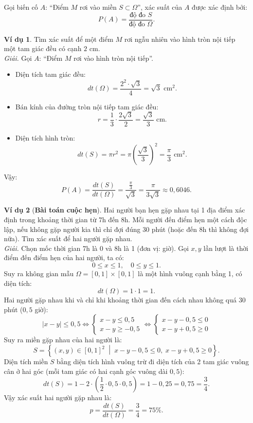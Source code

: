 \documentclass[12pt,a4paper]{article}
\theoremstyle{definition}
\newtheorem{vidu}{Ví dụ}[section]
\begin{document}
Gọi biến cố $A$: ``Điểm $M$ rơi vào miền $S \subset \Omega$'', xác suất của $A$ được xác định bởi:
\[
P(A) = \frac{\text{độ đo } S}{\text{độ đo } \Omega}.
\]

\begin{vidu}
Tìm xác suất để một điểm $M$ rơi ngẫu nhiên vào hình tròn nội tiếp một tam giác đều có cạnh $2\text{ cm}$.\\
\textit{Giải.} Gọi $A$: ``Điểm $M$ rơi vào hình tròn nội tiếp''.
\begin{itemize}
    \item Diện tích tam giác đều:
    \[
    dt(\Omega) = \frac{2^2 \cdot \sqrt{3}}{4} = \sqrt{3}\text{ cm}^2.
    \]
    \item Bán kính của đường tròn nội tiếp tam giác đều:
    \[
    r = \frac{1}{3} \cdot \frac{2\sqrt{3}}{2} = \frac{\sqrt{3}}{3}\text{ cm}.
    \]
    \item Diện tích hình tròn:
    \[
    dt(S) = \pi r^2 = \pi \left(\frac{\sqrt{3}}{3}\right)^2 = \frac{\pi}{3}\text{ cm}^2.
    \]
\end{itemize}
Vậy:
\[
P(A) = \frac{dt(S)}{dt(\Omega)} = \frac{\frac{\pi}{3}}{\sqrt{3}} = \frac{\pi}{3\sqrt{3}} \approx 0{,}6046.
\]
\end{vidu}

\begin{vidu}[\textbf{Bài toán cuộc hẹn}]
Hai người bạn hẹn gặp nhau tại 1 địa điểm xác định trong khoảng thời gian từ 7h đến 8h. Mỗi người đến điểm hẹn một cách độc lập, nếu không gặp người kia thì chỉ đợi đúng 30 phút (hoặc đến 8h thì không đợi nữa). Tìm xác suất để hai người gặp nhau.\\
\textit{Giải.}
Chọn mốc thời gian 7h là 0 và 8h là 1 (đơn vị: giờ).
Gọi $x, y$ lần lượt là thời điểm đến điểm hẹn của hai người, ta có:
\[
0 \le x \le 1, \quad 0 \le y \le 1.
\]
Suy ra không gian mẫu $\Omega = [0, 1] \times [0, 1]$ là một hình vuông cạnh bằng 1, có diện tích:
\[
dt(\Omega) = 1 \cdot 1 = 1.
\]
Hai người gặp nhau khi và chỉ khi khoảng thời gian đến cách nhau không quá 30 phút ($0{,}5$ giờ):
\[
|x - y| \le 0{,}5 \iff \begin{cases}
x - y \le 0{,}5 \\
x - y \ge -0{,}5
\end{cases} \iff \begin{cases}
x - y - 0{,}5 \le 0 \\
x - y + 0{,}5 \ge 0
\end{cases}
\]
Suy ra miền gặp nhau của hai người là:
\[
S = \left\{(x, y) \in [0, 1]^2 \;\middle|\; x - y - 0{,}5 \le 0, \; x - y + 0{,}5 \ge 0\right\}.
\]
Diện tích miền $S$ bằng diện tích hình vuông trừ đi diện tích của 2 tam giác vuông cân ở hai góc (mỗi tam giác có hai cạnh góc vuông dài $0{,}5$):
\[
dt(S) = 1 - 2 \cdot \left(\frac{1}{2} \cdot 0{,}5 \cdot 0{,}5\right) = 1 - 0{,}25 = 0{,}75 = \frac{3}{4}.
\]
Vậy xác suất hai người gặp nhau là:
\[
p = \frac{dt(S)}{dt(\Omega)} = \frac{3}{4} = 75\%.
\]
\end{vidu}
\end{document}
